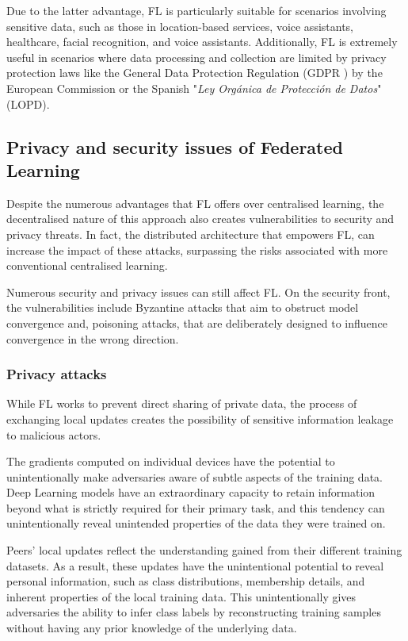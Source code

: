 Due to the latter advantage, FL is particularly suitable for scenarios involving sensitive data, such as those in location-based services, voice assistants, healthcare,  facial recognition, and voice assistants. Additionally, FL is extremely useful in scenarios where data processing and collection are limited by privacy protection laws like the General Data Protection Regulation (GDPR \cite{GDPR}) by the European Commission or the Spanish "\textit{Ley Orgánica de Protección de Datos}" (LOPD).

\subsection{Privacy and security issues of Federated Learning}\label{sec:state_of_the_art}
Despite the numerous advantages that FL offers over centralised learning, the decentralised nature of this approach also creates vulnerabilities to security and privacy threats. In fact, the distributed architecture that empowers FL, can increase the impact of these attacks, surpassing the risks associated with more conventional centralised learning.

Numerous security and privacy issues can still affect FL. On the security front, the vulnerabilities include Byzantine attacks that aim to obstruct model convergence and, poisoning attacks, that are deliberately designed to influence convergence in the wrong direction.

\subsubsection{Privacy attacks}
While FL works to prevent direct sharing of private data, the process of exchanging local updates creates the possibility of sensitive information leakage to malicious actors.

The gradients computed on individual devices have the potential to unintentionally make adversaries aware of subtle aspects of the training data. Deep Learning models have an extraordinary capacity to retain information beyond what is strictly required for their primary task, and this tendency can unintentionally reveal unintended properties of the data they were trained on.

Peers' local updates reflect the understanding gained from their different training datasets. As a result, these updates have the unintentional potential to reveal personal information, such as class distributions, membership details, and inherent properties of the local training data. This unintentionally gives adversaries the ability to infer class labels by reconstructing training samples without having any prior knowledge of the underlying data.

